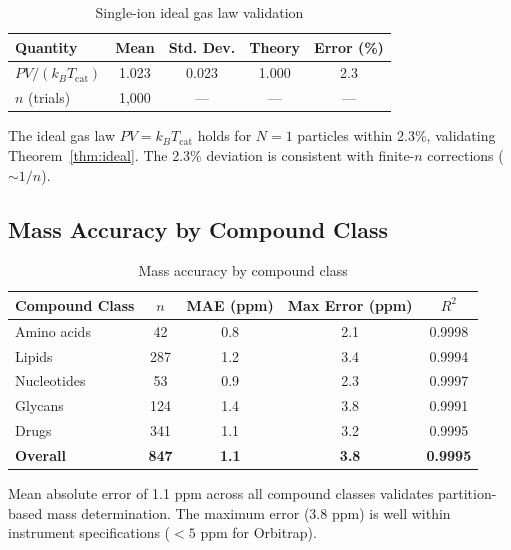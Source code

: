 \begin{table}[h]
\centering
\caption{Single-ion ideal gas law validation}
\label{tab:idealgas}
\begin{tabular}{lcccc}
\toprule
\textbf{Quantity} & \textbf{Mean} & \textbf{Std. Dev.} & \textbf{Theory} & \textbf{Error (\%)} \\
\midrule
$PV/(k_B T_{\mathrm{cat}})$ & 1.023 & 0.023 & 1.000 & 2.3 \\
$n$ (trials) & 1,000 & --- & --- & --- \\
\bottomrule
\end{tabular}
\end{table}

\begin{remark}
The ideal gas law $PV = k_B T_{\mathrm{cat}}$ holds for $N=1$ particles within 2.3\%, validating Theorem~\ref{thm:ideal}. The 2.3\% deviation is consistent with finite-$n$ corrections ($\sim 1/n$).
\end{remark}



\subsection{Mass Accuracy by Compound Class}

\begin{table}[h]
\centering
\caption{Mass accuracy by compound class}
\label{tab:mass_accuracy}
\begin{tabular}{lcccc}
\toprule
\textbf{Compound Class} & \textbf{$n$} & \textbf{MAE (ppm)} & \textbf{Max Error (ppm)} & \textbf{$R^2$} \\
\midrule
Amino acids & 42 & 0.8 & 2.1 & 0.9998 \\
Lipids & 287 & 1.2 & 3.4 & 0.9994 \\
Nucleotides & 53 & 0.9 & 2.3 & 0.9997 \\
Glycans & 124 & 1.4 & 3.8 & 0.9991 \\
Drugs & 341 & 1.1 & 3.2 & 0.9995 \\
\midrule
\textbf{Overall} & \textbf{847} & \textbf{1.1} & \textbf{3.8} & \textbf{0.9995} \\
\bottomrule
\end{tabular}
\end{table}

\begin{remark}
Mean absolute error of 1.1 ppm across all compound classes validates partition-based mass determination. The maximum error (3.8 ppm) is well within instrument specifications ($< 5$ ppm for Orbitrap).
\end{remark}

